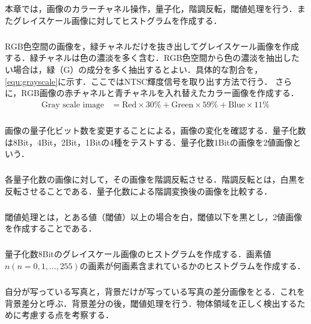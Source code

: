 \chapter{\kadaia}
\section{\purpose}
本章では，画像のカラーチャネル操作，量子化，階調反転，閾値処理を行う．またグレイスケール画像に対してヒストグラムを作成する．
\paragraph{\kadaiaa}RGB色空間の画像を，緑チャネルだけを抜き出してグレイスケール画像を作成する．緑チャネルは色の濃淡を多く含む．RGB色空間から色の濃淡を抽出したい場合は，緑（G）の成分を多く抽出するとよい．具体的な割合を，\eqref{equ:grayscale}に示す．ここではNTSC輝度信号を取り出す方法で行う．
さらに，RGB画像の赤チャネルと青チャネルを入れ替えたカラー画像を作成する．
\begin{align}
    \textrm{Gray scale image} & = \textrm{Red}\times 30\% +\textrm{Green}\times 59\% +\textrm{Blue}\times 11\%\label{equ:grayscale}
\end{align}
\paragraph{\kadaiab}画像の量子化ビット数を変更することによる，画像の変化を確認する．量子化数は8Bit，4Bit，2Bit，1Bitの4種をテストする．量子化数1Bitの画像を2値画像という．
\paragraph{\kadaiac}各量子化数の画像に対して，その画像を階調反転させる．階調反転とは，白黒を反転させることである．量子化数による階調変換後の画像を比較する．
\paragraph{\kadaiad}閾値処理とは，とある値（閾値）以上の場合を白，閾値以下を黒とし，2値画像を作成することである．
\paragraph{\kadaiae}量子化数8Bitのグレイスケール画像のヒストグラムを作成する．画素値\(n(n=0,1,\dots ,255)\)の画素が何画素含まれているかのヒストグラムを作成する．
\paragraph{\kadaiaf}自分が写っている写真と，背景だけが写っている写真の差分画像をとる．これを背景差分と呼ぶ．背景差分の後，閾値処理を行う．物体領域を正しく検出するために考慮する点を考察する．